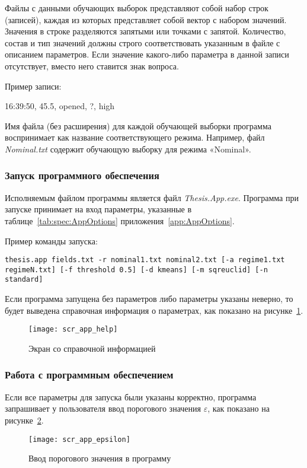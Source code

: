 Файлы с данными обучающих выборок представляют собой набор строк (записей), каждая из которых представляет собой вектор с набором значений. Значения в строке разделяются запятыми или точками с запятой. Количество, состав и тип значений должны строго соответствовать указанным в файле с описанием параметров. Если значение какого-либо параметра в данной записи отсутствует, вместо него ставится знак вопроса.

Пример записи:

\textsf{16:39:50, 45.5, opened, ?, high}

Имя файла (без расширения) для каждой обучающей выборки программа воспринимает как название соответствующего режима. Например, файл \textit{Nominal.txt} содержит обучающую выборку для режима «Nominal».

\subsubsection{Запуск программного обеспечения}
Исполняемым файлом программы является файл \textit{Thesis.App.exe}. Программа при запуске принимает на вход параметры, указанные в таблице~\ref{tab:spec:AppOptions} приложения~\ref{app:AppOptions}.

Пример команды запуска:

\texttt{thesis.app fields.txt -r nominal1.txt nominal2.txt [-a regime1.txt regimeN.txt] [-f threshold 0.5] [-d kmeans] [-m sqreuclid] [-n standard]}

Если программа запущена без параметров либо параметры указаны неверно, то будет выведена справочная информация о параметрах, как показано на рисунке~\ref{fig:spec:scr:AppHelp}.

\begin{figure}[h]
\texttt{[image: scr\_app\_help]}
\caption{Экран со справочной информацией}
\label{fig:spec:scr:AppHelp}
\end{figure}

\subsubsection{Работа с программным обеспечением}
Если все параметры для запуска были указаны корректно, программа запрашивает у пользователя ввод порогового значения $\varepsilon$, как показано на рисунке~\ref{fig:spec:scr:EnterEpsilon}.

\begin{figure}[h]
\texttt{[image: scr\_app\_epsilon]}
\caption{Ввод порогового значения в программу}
\label{fig:spec:scr:EnterEpsilon}
\end{figure}

